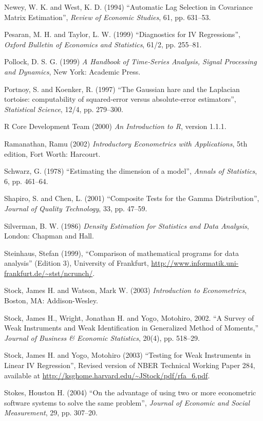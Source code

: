 \begin{thebibliography}
  Newey, W. K. and West, K. D. (1994) ``Automatic Lag Selection in
  Covariance Matrix Estimation'', \emph{Review of Economic Studies},
  61, pp. 631--53.

  Pesaran, M. H. and Taylor, L. W. (1999) ``Diagnostics for IV
  Regressions'', \emph{Oxford Bulletin of Economics and Statistics},
  61/2, pp. 255--81.

  Pollock, D. S. G. (1999) \emph{A Handbook of Time-Series Analysis,
    Signal Processing and Dynamics}, New York: Academic Press.

  Portnoy, S. and Koenker, R. (1997) ``The Gaussian hare and the
  Laplacian tortoise: computability of squared-error versus
  absolute-error estimators'', \emph{Statistical Science}, 12/4,
  pp. 279--300.
  
  R Core Development Team (2000) \emph{An Introduction to R}, version
  1.1.1.

  Ramanathan, Ramu (2002) \emph{Introductory Econometrics with
    Applications}, 5th edition, Fort Worth: Harcourt.
  
  Schwarz, G. (1978) ``Estimating the dimension of a model'',
  \textit{Annals of Statistics}, 6, pp. 461--64.
  
  Shapiro, S. and Chen, L. (2001) ``Composite Tests for the Gamma
  Distribution'', \emph{Journal of Quality Technology}, 33, pp.
  47--59.
    
  Silverman, B. W. (1986) \emph{Density Estimation for Statistics and
    Data Analysis}, London: Chapman and Hall.

  Steinhaus, Stefan (1999), ``Comparison of mathematical programs for
  data analysis'' (Edition 3), University of Frankfurt, 
  \url{http://www.informatik.uni-frankfurt.de/~stst/ncrunch/}.
  
  Stock, James H. and Watson, Mark W. (2003) \emph{Introduction to
    Econometrics}, Boston, MA: Addison-Wesley.

  Stock, James H., Wright, Jonathan H. and Yogo, Motohiro, 2002. ``A
  Survey of Weak Instruments and Weak Identification in Generalized
  Method of Moments,'' \emph{Journal of Business \& Economic
    Statistics}, 20(4), pp. 518--29.

  Stock, James H. and Yogo, Motohiro (2003) ``Testing for Weak
  Instruments in Linear IV Regression'', Revised version of 
  NBER Technical Working Paper 284, available at
  \url{http://ksghome.harvard.edu/~JStock/pdf/rfa_6.pdf}.

  Stokes, Houston H. (2004) ``On the advantage of using two or more
  econometric software systems to solve the same problem'',
  \emph{Journal of Economic and Social Measurement}, 29, pp. 307--20.


\end{thebibliography}

